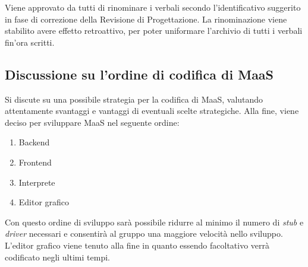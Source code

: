 \documentclass[11pt]{meetingmins}
\begin{document}
Viene approvato da tutti di rinominare i verbali secondo l'identificativo suggerito in fase di correzione della Revisione di Progettazione. La rinominazione viene stabilito avere effetto retroattivo, per poter uniformare l'archivio di tutti i verbali fin'ora scritti.

\subsection{Discussione su l'ordine di codifica di MaaS}

Si discute su una possibile strategia per la codifica di MaaS, valutando attentamente svantaggi e vantaggi di eventuali scelte strategiche. Alla fine, viene deciso per sviluppare MaaS nel seguente ordine:
\begin{enumerate}

\item Backend
\item Frontend
\item Interprete
\item Editor grafico
\end{enumerate}

Con questo ordine di sviluppo sar\`a possibile ridurre al minimo il numero di \textit{stub} e \textit{driver} necessari e consentir\`a al gruppo una maggiore velocit\`a nello sviluppo. L'editor grafico viene tenuto alla fine in quanto essendo facoltativo verr\`a codificato negli ultimi tempi.


\end{document}
